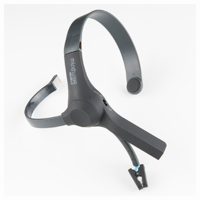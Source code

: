 \documentclass[a4 paper,12pt]{article}
\begin{document}
\begin{center}
	\graphicspath{ {images/} }
	\includegraphics[width=12cm, height=10cm]{Mindwave_mobile}
\end{center}
\end{document}
